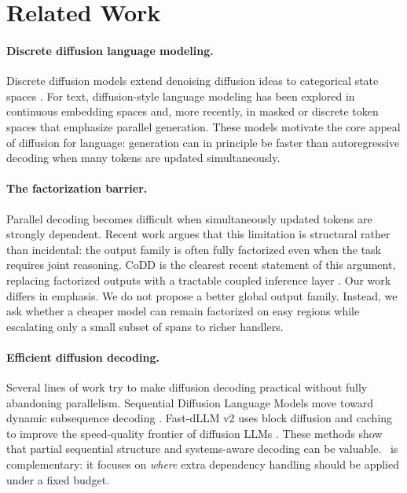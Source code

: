 \section{Related Work}
\label{sec:related}

\paragraph{Discrete diffusion language modeling.}
Discrete diffusion models extend denoising diffusion ideas to categorical state spaces \citep{austin2021d3pm}. For text, diffusion-style language modeling has been explored in continuous embedding spaces \citep{strudel2022selfconditioned} and, more recently, in masked or discrete token spaces that emphasize parallel generation. These models motivate the core appeal of diffusion for language: generation can in principle be faster than autoregressive decoding when many tokens are updated simultaneously.

\paragraph{The factorization barrier.}
Parallel decoding becomes difficult when simultaneously updated tokens are strongly dependent. Recent work argues that this limitation is structural rather than incidental: the output family is often fully factorized even when the task requires joint reasoning. CoDD is the clearest recent statement of this argument, replacing factorized outputs with a tractable coupled inference layer \citep{li2026codd}. Our work differs in emphasis. We do not propose a better global output family. Instead, we ask whether a cheaper model can remain factorized on easy regions while escalating only a small subset of spans to richer handlers.

\paragraph{Efficient diffusion decoding.}
Several lines of work try to make diffusion decoding practical without fully abandoning parallelism. Sequential Diffusion Language Models move toward dynamic subsequence decoding \citep{liu2026sdlm}. Fast-dLLM v2 uses block diffusion and caching to improve the speed-quality frontier of diffusion LLMs \citep{wu2026fastdllmv2}. These methods show that partial sequential structure and systems-aware decoding can be valuable. \method\ is complementary: it focuses on \emph{where} extra dependency handling should be applied under a fixed budget.

